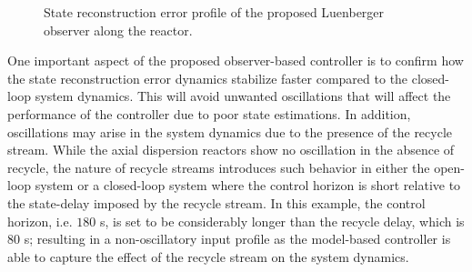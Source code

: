 \begin{figure}[!htbp]
    \centering
    
    \caption{State reconstruction error profile of the proposed Luenberger observer along the reactor.}
    \label{fig:observation_error}
\end{figure}

One important aspect of the proposed observer-based controller is to confirm how the state reconstruction error dynamics stabilize faster compared to the closed-loop system dynamics. This will avoid unwanted oscillations that will affect the performance of the controller due to poor state estimations. In addition, oscillations may arise in the system dynamics due to the presence of the recycle stream. While the axial dispersion reactors show no oscillation in the absence of recycle, the nature of recycle streams introduces such behavior in either the open-loop system or a closed-loop system where the control horizon is short relative to the state-delay imposed by the recycle stream. In this example, the control horizon, i.e. $180$ s, is set to be considerably longer than the recycle delay, which is $80$ s; resulting in a non-oscillatory input profile as the model-based controller is able to capture the effect of the recycle stream on the system dynamics.